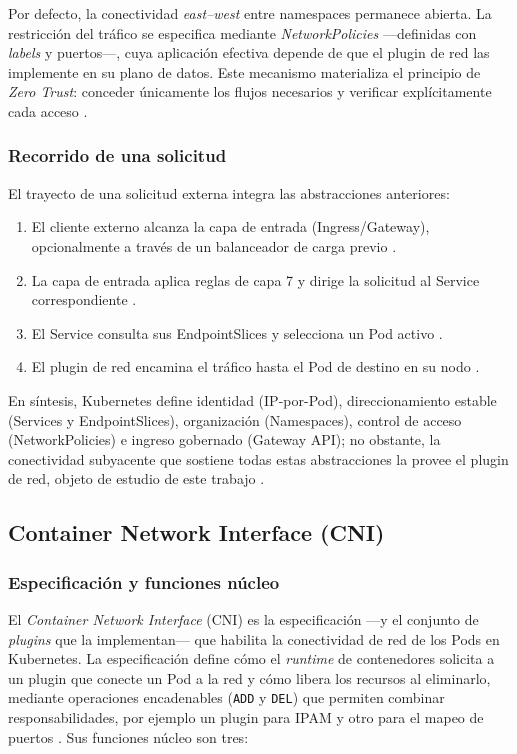 Por defecto, la conectividad \emph{east--west} entre namespaces permanece abierta. La restricción del tráfico se especifica mediante \emph{NetworkPolicies} ---definidas con \emph{labels} y puertos---, cuya aplicación efectiva depende de que el plugin de red las implemente en su plano de datos. Este mecanismo materializa el principio de \emph{Zero Trust}: conceder únicamente los flujos necesarios y verificar explícitamente cada acceso \cite{ref4,ref24,ref25,ref26}.

\subsubsection{Recorrido de una solicitud}

El trayecto de una solicitud externa integra las abstracciones anteriores:

\begin{enumerate}
\item El cliente externo alcanza la capa de entrada (Ingress/Gateway), opcionalmente a través de un balanceador de carga previo \cite{ref17}.
\item La capa de entrada aplica reglas de capa 7 y dirige la solicitud al Service correspondiente \cite{ref3,ref13}.
\item El Service consulta sus EndpointSlices y selecciona un Pod activo \cite{ref1}.
\item El plugin de red encamina el tráfico hasta el Pod de destino en su nodo \cite{ref2,ref4,ref18}.
\end{enumerate}

En síntesis, Kubernetes define identidad (IP-por-Pod), direccionamiento estable (Services y EndpointSlices), organización (Namespaces), control de acceso (NetworkPolicies) e ingreso gobernado (Gateway API); no obstante, la conectividad subyacente que sostiene todas estas abstracciones la provee el plugin de red, objeto de estudio de este trabajo \cite{ref1,ref2,ref3,ref4,ref13,ref17,ref18}.

\subsection{Container Network Interface (CNI)}

\subsubsection{Especificación y funciones núcleo}

El \emph{Container Network Interface} (CNI) es la especificación ---y el conjunto de \emph{plugins} que la implementan--- que habilita la conectividad de red de los Pods en Kubernetes. La especificación define cómo el \emph{runtime} de contenedores solicita a un plugin que conecte un Pod a la red y cómo libera los recursos al eliminarlo, mediante operaciones encadenables (\texttt{ADD} y \texttt{DEL}) que permiten combinar responsabilidades, por ejemplo un plugin para IPAM y otro para el mapeo de puertos \cite{ref18,ref4,ref21,ref20}. Sus funciones núcleo son tres:

